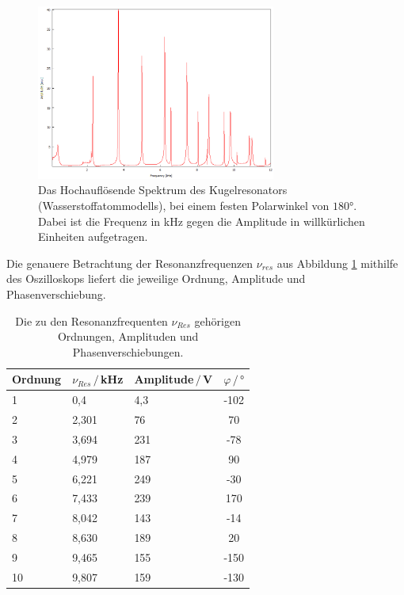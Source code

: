 \begin{figure}
    \center
    \includegraphics[width=0.7\textwidth]{data/Wasserstoffatom/Ohne_Ring/Spektrum_180_first.png}%
    \caption{Das Hochauflösende Spektrum des Kugelresonators (Wasserstoffatommodells), bei einem 
    festen Polarwinkel von $180°$. Dabei ist die Frequenz in kHz gegen die Amplitude in willkürlichen Einheiten aufgetragen.}
    \label{fig:kugel_res}
\end{figure}

Die genauere Betrachtung der Resonanzfrequenzen $\nu_{res}$ aus Abbildung \ref{fig:kugel_res} mithilfe des Oszilloskops
liefert die jeweilige Ordnung, Amplitude und Phasenverschiebung.

\begin{table}[H]
    \center
    \caption{Die zu den Resonanzfrequenten $\nu_{Res}$ gehörigen Ordnungen, Amplituden und Phasenverschiebungen.}
    \begin{tabular}{l l l c}
        \toprule
        Ordnung & $\nu_{Res}\,/\,$kHz & Amplitude$\,/\,$V & $\varphi\,/\,°$\\
        \midrule
        1 &0,4   &4,3  & -102  \\
        2 &2,301 &76   &   70  \\
        3 &3,694 &231  &  -78  \\
        4 &4,979 &187  &   90  \\
        5 &6,221 &249  &  -30  \\
        6 &7,433 &239  &  170  \\
        7 &8,042 &143  &  -14  \\
        8 &8,630 &189  &   20  \\
        9 &9,465 &155  & -150  \\
        10&9,807 &159  & -130  \\
        \bottomrule
    \end{tabular}
\end{table}


